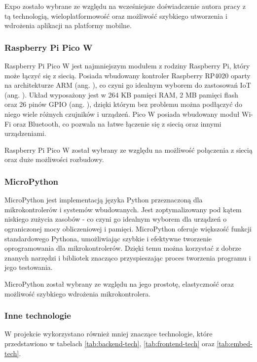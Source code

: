 Expo zostało wybrane ze względu na wcześniejsze doświadczenie autora pracy z tą technologią, wieloplatformowość oraz możliwość szybkiego utworzenia i wdrożenia aplikacji na platformy mobilne.

\subsubsection*{Raspberry Pi Pico W}

Raspberry Pi Pico W jest najmniejszym modułem z rodziny Raspberry Pi, który może łączyć się z siecią. Posiada wbudowany kontroler Raspberry RP4020 oparty na architekturze ARM (ang. ), co czyni go idealnym wyborem do zastosowań IoT (ang. ). Układ wyposażony jest w 264 KB pamięci RAM, 2 MB pamięci flash oraz 26 pinów GPIO (ang. ), dzięki którym bez problemu można podłączyć do niego wiele różnych czujników i urządzeń. Pico W posiada wbudowany moduł Wi-Fi oraz Bluetooth, co pozwala na łatwe łączenie się z siecią oraz innymi urządzeniami.

Raspberry Pi Pico W został wybrany ze względu na możliwość połączenia z siecią oraz duże możliwości rozbudowy. \cite{bib:picoW}

\subsubsection*{MicroPython}

MicroPython jest implementacją języka Python przeznaczoną dla mikrokontrolerów i systemów wbudowanych. Jest zoptymalizowany pod kątem niskiego zużycia zasobów - co czyni go idealnym wyborem dla urządzeń o ograniczonej mocy obliczeniowej i pamięci. MicroPython oferuje większość funkcji standardowego Pythona, umożliwiając szybkie i efektywne tworzenie oprogramowania dla mikrokontrolerów. Dzięki temu można korzystać z dobrze znanych narzędzi i bibliotek znacząco przyspieszając proces tworzenia programu i jego testowania. \cite{bib:micropython}

MicroPython został wybrany ze względu na jego prostotę, elastyczność oraz możliwość szybkiego wdrożenia mikrokontrolera.

\subsubsection*{Inne technologie}

W projekcie wykorzystano również mniej znaczące technologie, które przedstawiono w tabelach \ref{tab:backend-tech}, \ref{tab:frontend-tech} oraz \ref{tab:embed-tech}.

